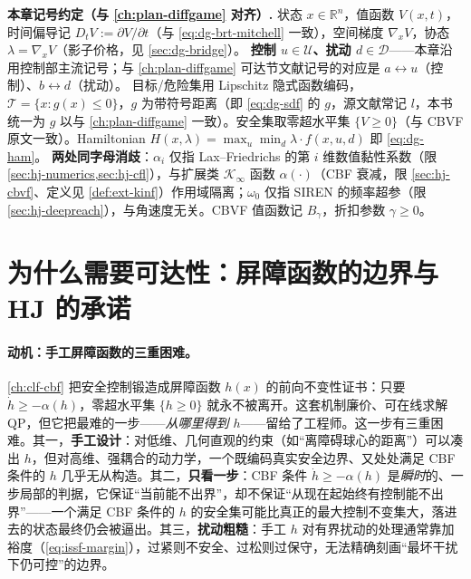 \begin{note}
\textbf{本章记号约定（与 \cref{ch:plan-diffgame} 对齐）.}\;
状态 $x\in\mathbb R^n$，值函数 $V(x,t)$，时间偏导记 $D_tV:=\partial V/\partial t$（与 \cref{eq:dg-brt-mitchell} 一致），空间梯度 $\nabla_xV$，协态 $\lambda=\nabla_xV$（影子价格，见 \cref{sec:dg-bridge}）。
\textbf{控制 $u\in\mathcal U$、扰动 $d\in\mathcal D$}——本章沿用控制部主流记号；与 \cref{ch:plan-diffgame} 可达节文献记号的对应是 $a\leftrightarrow u$（控制）、$b\leftrightarrow d$（扰动）。
目标/危险集用 Lipschitz 隐式函数编码，$\mathcal T=\{x:g(x)\le0\}$，$g$ 为带符号距离（即 \cref{eq:dg-sdf} 的 $g$，源文献常记 $l$，本书统一为 $g$ 以与 \cref{ch:plan-diffgame} 一致）。安全集取零超水平集 $\{V\ge0\}$（与 CBVF 原文一致）。Hamiltonian $H(x,\lambda)=\max_{u}\min_{d}\lambda\cdot f(x,u,d)$ 即 \cref{eq:dg-ham}。
\textbf{两处同字母消歧}：$\alpha_i$ 仅指 Lax--Friedrichs 的第 $i$ 维数值黏性系数（限 \cref{sec:hj-numerics,sec:hj-cfl}），与扩展类 $\mathcal K_\infty$ 函数 $\alpha(\cdot)$（CBF 衰减，限 \cref{sec:hj-cbvf}、定义见 \cref{def:ext-kinf}）作用域隔离；$\omega_0$ 仅指 SIREN 的频率超参（限 \cref{sec:hj-deepreach}），与角速度无关。CBVF 值函数记 $B_\gamma$，折扣参数 $\gamma\ge0$。
\end{note}

\section{为什么需要可达性：屏障函数的边界与 HJ 的承诺}
\label{sec:hj-why}

\paragraph{动机：手工屏障函数的三重困难。}
\cref{ch:clf-cbf} 把安全控制锻造成屏障函数 $h(x)$ 的前向不变性证书：只要 $\dot h\ge-\alpha(h)$，零超水平集 $\{h\ge0\}$ 就永不被离开。这套机制廉价、可在线求解 QP，但它把最难的一步——\emph{从哪里得到 $h$}——留给了工程师。这一步有三重困难。其一，\textbf{手工设计}：对低维、几何直观的约束（如“离障碍球心的距离”）可以凑出 $h$，但对高维、强耦合的动力学，一个既编码真实安全边界、又处处满足 CBF 条件的 $h$ 几乎无从构造。其二，\textbf{只看一步}：CBF 条件 $\dot h\ge-\alpha(h)$ 是\emph{瞬时}的、一步局部的判据，它保证“当前能不出界”，却不保证“从现在起始终有控制能不出界”——一个满足 CBF 条件的 $h$ 的安全集可能比真正的最大控制不变集大，落进去的状态最终仍会被逼出。其三，\textbf{扰动粗糙}：手工 $h$ 对有界扰动的处理通常靠加裕度（\cref{eq:issf-margin}），过紧则不安全、过松则过保守，无法精确刻画“最坏干扰下仍可控”的边界。

